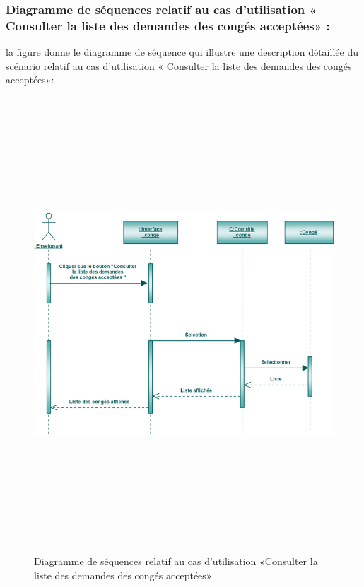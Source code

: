 \documentclass[12 pt ]{report}
\begin{document}
\subsubsection{Diagramme de séquences relatif au cas d’utilisation « Consulter la liste des demandes
 des congés acceptées» :}
la figure   donne le diagramme de séquence qui illustre une description détaillée du scénario relatif au cas d’utilisation « Consulter la liste des demandes
 des congés acceptées»: 
\begin{figure}[h]
 \begin{center}
\includegraphics[width= 18 cm ,height=  17cm]{scct.PNG}
\caption{Diagramme de séquences relatif au cas d’utilisation «Consulter la liste des demandes
 des congés acceptées»}

\end{center}
\end{figure}
\clearpage
\end{document}
